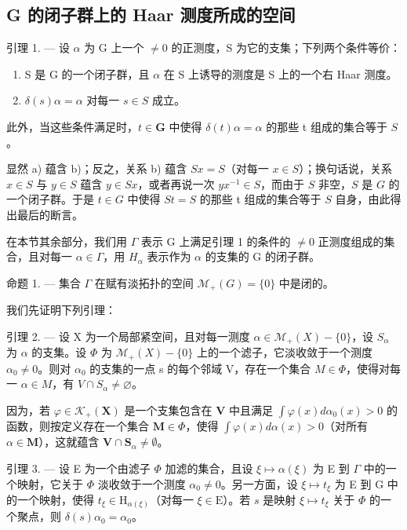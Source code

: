 \subsection{G 的闭子群上的 Haar 测度所成的空间}

引理 1. --- 设 \(\alpha\) 为 G 上一个 \(\neq 0\) 的正测度，S 为它的支集；下列两个条件等价：

\begin{enumerate}
\def\labelenumi{\alph{enumi})}
\item
  S 是 G 的一个闭子群，且 \(\alpha\) 在 S 上诱导的测度是 S 上的一个右 Haar 测度。
\item
  \(\delta(s)\alpha = \alpha\) 对每一 \(s \in S\) 成立。
\end{enumerate}

此外，当这些条件满足时，\(t \in \mathbf{G}\) 中使得 \(\delta(t)\alpha = \alpha\) 的那些 t 组成的集合等于 \(S\)。

显然 a) 蕴含 b)；反之，关系 b) 蕴含 \(Sx = S\)（对每一 \(x \in S\)）；换句话说，关系 \(x \in S\) 与 \(y \in S\) 蕴含 \(y \in Sx\)，或者再说一次 \(yx^{-1} \in S\)，而由于 \(S\) 非空，\(S\) 是 \(G\) 的一个闭子群。于是 \(t \in G\) 中使得 \(St = S\) 的那些 t 组成的集合等于 \(S\) 自身，由此得出最后的断言。

在本节其余部分，我们用 \(\Gamma\) 表示 G 上满足引理 1 的条件的 \(\neq0\) 正测度组成的集合，且对每一 \(\alpha\in\Gamma\)，用 \(H_{\alpha}\) 表示作为 \(\alpha\) 的支集的 G 的闭子群。

命题 1. --- 集合 \(\Gamma\) 在赋有淡拓扑的空间 \(\mathcal{M}_{+}(G) = \{0\}\) 中是闭的。

我们先证明下列引理：

引理 2. --- 设 X 为一个局部紧空间，且对每一测度 \(\alpha \in \mathcal{M}_{+}(X) - \{0\}\)，设 \(S_{\alpha}\) 为 \(\alpha\) 的支集。设 \(\Phi\) 为 \(\mathcal{M}_{+}(X) - \{0\}\) 上的一个滤子，它淡收敛于一个测度 \(\alpha_{0} \neq 0\)。则对 \(\alpha_{0}\) 的支集的一点 s 的每个邻域 V，存在一个集合 \(M \in \Phi\)，使得对每一 \(\alpha \in M\)，有 \(V \cap S_{\alpha} \neq \varnothing\)。

因为，若 \(\varphi \in \mathcal{K}_{+}(\mathbf{X})\) 是一个支集包含在 \(\mathbf{V}\) 中且满足 \(\int \varphi(x)d\alpha_0(x) > 0\) 的函数，则按定义存在一个集合 \(\mathbf{M} \in \Phi\)，使得 \(\int \varphi(x)d\alpha(x) > 0\)（对所有 \(\alpha \in \mathbf{M}\)），这就蕴含 \(\mathbf{V} \cap \mathbf{S}_{\alpha} \neq \emptyset\)。

引理 3. --- 设 E 为一个由滤子 \(\Phi\) 加滤的集合，且设 \(\xi \mapsto \alpha(\xi)\) 为 E 到 \(\Gamma\) 中的一个映射，它关于 \(\Phi\) 淡收敛于一个测度 \(\alpha_0 \neq 0\)。另一方面，设 \(\xi \mapsto t_{\xi}\) 为 E 到 G 中的一个映射，使得 \(t_{\xi} \in \mathrm{H}_{\alpha(\xi)}\)（对每一 \(\xi \in \mathrm{E}\)）。若 \(s\) 是映射 \(\xi \mapsto t_{\xi}\) 关于 \(\Phi\) 的一个聚点，则 \(\delta(s)\alpha_0 = \alpha_0\)。

